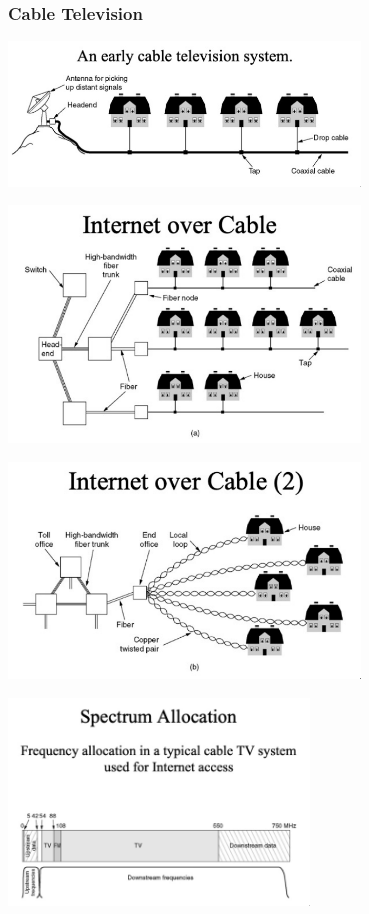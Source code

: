 \documentclass[11pt]{article}
\begin{document}
\subsubsection{Cable Television} 
\begin{center}
    \includegraphics[width=0.7\textwidth]{communityantennatelevision.png}
\end{center}

\begin{center}
    \includegraphics[width=0.7\textwidth]{internetovercable.png}
\end{center}

\begin{center}
    \includegraphics[width=0.7\textwidth]{internetovercable2.png}
\end{center}

\begin{center}
    \includegraphics[width=0.6\textwidth]{spectrumallocation.png}
\end{center}
\end{document}
